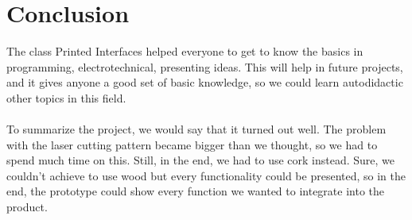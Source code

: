 \documentclass[00_doc.tex]{subfiles}
\begin{document}
    \section{Conclusion}
    \begin{flushleft}
        The class Printed Interfaces helped everyone to get to know the basics in programming,
        electrotechnical, presenting ideas. This will help in future projects, and it gives anyone 
        a good set of basic knowledge, so we could learn autodidactic other topics in this field.\\~\\

        To summarize the project, we would say that it turned out well. The problem with the laser 
        cutting pattern became bigger than we thought, so we had to spend much time on this. Still, 
        in the end, we had to use cork instead. Sure, we couldn't achieve to use wood but every 
        functionality could be presented, so in the end, the prototype could show every function we 
        wanted to integrate into the product.
    \end{flushleft}
\end{document}
